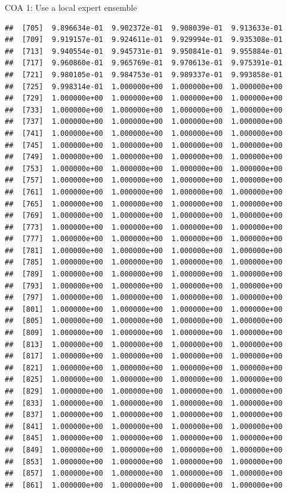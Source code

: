 \documentclass[ignorenonframetext,]{beamer}
\begin{document}
\begin{frame}[fragile]{COA 1: Use a local expert ensemble}
\begin{verbatim}
##  [705]  9.896634e-01  9.902372e-01  9.908039e-01  9.913633e-01
##  [709]  9.919157e-01  9.924611e-01  9.929994e-01  9.935308e-01
##  [713]  9.940554e-01  9.945731e-01  9.950841e-01  9.955884e-01
##  [717]  9.960860e-01  9.965769e-01  9.970613e-01  9.975391e-01
##  [721]  9.980105e-01  9.984753e-01  9.989337e-01  9.993858e-01
##  [725]  9.998314e-01  1.000000e+00  1.000000e+00  1.000000e+00
##  [729]  1.000000e+00  1.000000e+00  1.000000e+00  1.000000e+00
##  [733]  1.000000e+00  1.000000e+00  1.000000e+00  1.000000e+00
##  [737]  1.000000e+00  1.000000e+00  1.000000e+00  1.000000e+00
##  [741]  1.000000e+00  1.000000e+00  1.000000e+00  1.000000e+00
##  [745]  1.000000e+00  1.000000e+00  1.000000e+00  1.000000e+00
##  [749]  1.000000e+00  1.000000e+00  1.000000e+00  1.000000e+00
##  [753]  1.000000e+00  1.000000e+00  1.000000e+00  1.000000e+00
##  [757]  1.000000e+00  1.000000e+00  1.000000e+00  1.000000e+00
##  [761]  1.000000e+00  1.000000e+00  1.000000e+00  1.000000e+00
##  [765]  1.000000e+00  1.000000e+00  1.000000e+00  1.000000e+00
##  [769]  1.000000e+00  1.000000e+00  1.000000e+00  1.000000e+00
##  [773]  1.000000e+00  1.000000e+00  1.000000e+00  1.000000e+00
##  [777]  1.000000e+00  1.000000e+00  1.000000e+00  1.000000e+00
##  [781]  1.000000e+00  1.000000e+00  1.000000e+00  1.000000e+00
##  [785]  1.000000e+00  1.000000e+00  1.000000e+00  1.000000e+00
##  [789]  1.000000e+00  1.000000e+00  1.000000e+00  1.000000e+00
##  [793]  1.000000e+00  1.000000e+00  1.000000e+00  1.000000e+00
##  [797]  1.000000e+00  1.000000e+00  1.000000e+00  1.000000e+00
##  [801]  1.000000e+00  1.000000e+00  1.000000e+00  1.000000e+00
##  [805]  1.000000e+00  1.000000e+00  1.000000e+00  1.000000e+00
##  [809]  1.000000e+00  1.000000e+00  1.000000e+00  1.000000e+00
##  [813]  1.000000e+00  1.000000e+00  1.000000e+00  1.000000e+00
##  [817]  1.000000e+00  1.000000e+00  1.000000e+00  1.000000e+00
##  [821]  1.000000e+00  1.000000e+00  1.000000e+00  1.000000e+00
##  [825]  1.000000e+00  1.000000e+00  1.000000e+00  1.000000e+00
##  [829]  1.000000e+00  1.000000e+00  1.000000e+00  1.000000e+00
##  [833]  1.000000e+00  1.000000e+00  1.000000e+00  1.000000e+00
##  [837]  1.000000e+00  1.000000e+00  1.000000e+00  1.000000e+00
##  [841]  1.000000e+00  1.000000e+00  1.000000e+00  1.000000e+00
##  [845]  1.000000e+00  1.000000e+00  1.000000e+00  1.000000e+00
##  [849]  1.000000e+00  1.000000e+00  1.000000e+00  1.000000e+00
##  [853]  1.000000e+00  1.000000e+00  1.000000e+00  1.000000e+00
##  [857]  1.000000e+00  1.000000e+00  1.000000e+00  1.000000e+00
##  [861]  1.000000e+00  1.000000e+00  1.000000e+00  1.000000e+00

\end{verbatim}
\end{frame}
\end{document}
